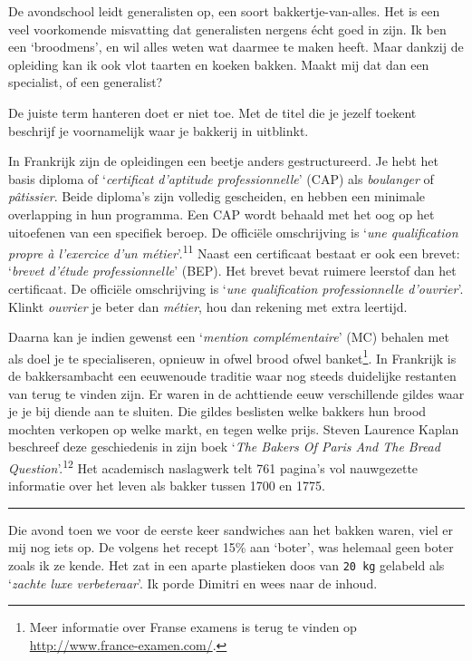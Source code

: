 \documentclass[
  11pt,
  dutch,
]{memoir}
\begin{document}
De avondschool leidt generalisten op, een soort bakkertje-van-alles. Het
is een veel voorkomende misvatting dat generalisten nergens écht goed in
zijn. Ik ben een `broodmens', en wil alles weten wat daarmee te maken
heeft. Maar dankzij de opleiding kan ik ook vlot taarten en koeken
bakken. Maakt mij dat dan een specialist, of een generalist?

De juiste term hanteren doet er niet toe. Met de titel die je jezelf
toekent beschrijf je voornamelijk waar je bakkerij in uitblinkt.

In Frankrijk zijn de opleidingen een beetje anders gestructureerd. Je
hebt het basis diploma of `\emph{certificat d'aptitude professionnelle}'
(CAP) als \emph{boulanger} of \emph{pâtissier}. Beide diploma's zijn
volledig gescheiden, en hebben een minimale overlapping in hun
programma. Een CAP wordt behaald met het oog op het uitoefenen van een
specifiek beroep. De officiële omschrijving is `\emph{une qualification
propre à l'exercice d'un métier}'.\textsuperscript{11} Naast een
certificaat bestaat er ook een brevet: `\emph{brevet d'étude
professionnelle}' (BEP). Het brevet bevat ruimere leerstof dan het
certificaat. De officiële omschrijving is `\emph{une qualification
professionnelle d'ouvrier}'. Klinkt \emph{ouvrier} je beter dan
\emph{métier}, hou dan rekening met extra leertijd.

Daarna kan je indien gewenst een `\emph{mention complémentaire}' (MC)
behalen met als doel je te specialiseren, opnieuw in ofwel brood ofwel
banket\footnote{Meer informatie over Franse examens is terug te vinden
  op \url{http://www.france-examen.com/}.}. In Frankrijk is de
bakkersambacht een eeuwenoude traditie waar nog steeds duidelijke
restanten van terug te vinden zijn. Er waren in de achttiende eeuw
verschillende gildes waar je je bij diende aan te sluiten. Die gildes
beslisten welke bakkers hun brood mochten verkopen op welke markt, en
tegen welke prijs. Steven Laurence Kaplan beschreef deze geschiedenis in
zijn boek `\emph{The Bakers Of Paris And The Bread
Question}'.\textsuperscript{12} Het academisch naslagwerk telt 761
pagina's vol nauwgezette informatie over het leven als bakker tussen
1700 en 1775.

\pfbreak

Die avond toen we voor de eerste keer sandwiches aan het bakken waren,
viel er mij nog iets op. De volgens het recept 15\% aan `boter', was
helemaal geen boter zoals ik ze kende. Het zat in een aparte plastieken
doos van \texttt{20\ kg} gelabeld als `\emph{zachte luxe verbeteraar}'.
Ik porde Dimitri en wees naar de inhoud.
\end{document}
